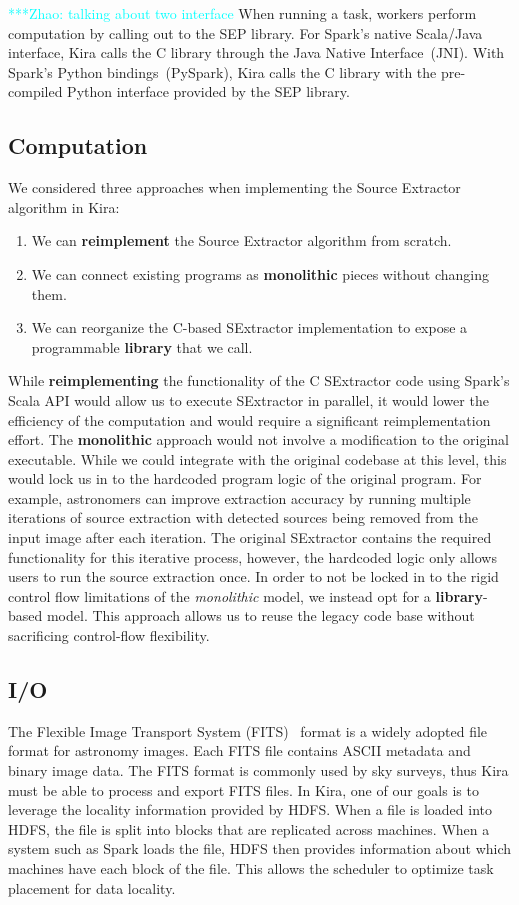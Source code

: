\documentclass[10pt,journal,compsoc]{IEEEtran}
\newcommand{\zhaonote}[1]{{\textcolor{cyan}    { ***Zhao:      #1 }}}
\newcommand{\zhaonote}[1]{}
\begin{document}
\zhaonote{talking about two interface}
When running a task, workers perform computation by calling out to the SEP library.
For Spark's native Scala/Java interface, Kira calls the C library through the Java Native Interface~(JNI).
With Spark's Python bindings~(PySpark), Kira calls the C library with the
pre-compiled Python interface provided by the SEP library. 

\subsection{Computation}
\label{sec:Design-Computation}
We considered three approaches when implementing the Source Extractor algorithm in Kira:

\begin{enumerate}
\item We can \textbf{reimplement} the Source Extractor algorithm from scratch.
\item We can connect existing programs as \textbf{monolithic} pieces without changing them.
\item We can reorganize the C-based SExtractor implementation to expose a programmable
\textbf{library} that we call.
\end{enumerate}

While \textbf{reimplementing} the functionality of the C SExtractor code using Spark's Scala API 
would allow us to execute SExtractor in parallel, it would lower the efficiency of the computation 
and would require a significant reimplementation effort.
The \textbf{monolithic} approach would not involve a modification to the original executable. While we could 
integrate with the original codebase at this level, this would lock us in to the hardcoded program logic 
of the original program. 
For example, astronomers can improve extraction accuracy by running multiple iterations of source
extraction with detected sources being removed from the input image after each iteration. 
The original SExtractor contains the required functionality for this iterative process, however, the hardcoded
logic only allows users to run the source extraction once.  
In order to not be locked in to the rigid control flow limitations of the \emph{monolithic} model, 
we instead opt for a \textbf{library}-based model.
This approach allows us to reuse the legacy code base without sacrificing control-flow flexibility.  


\subsection{I/O}
\label{sec:Design-I/O}
The Flexible Image Transport System (FITS)~\cite{wells81} format is a widely adopted file format for astronomy
images. Each FITS file contains ASCII metadata and binary image data.
The FITS format is commonly used by sky surveys, thus Kira must be able to process and export FITS files.
In Kira, one of our goals is to leverage the locality information provided by HDFS. When a file is loaded into 
HDFS, the file is split into blocks that are replicated across machines. When a system such as Spark loads the file, 
HDFS then provides information about which machines have each block of the file. This allows the
scheduler to optimize task placement for data locality.
\end{document}
